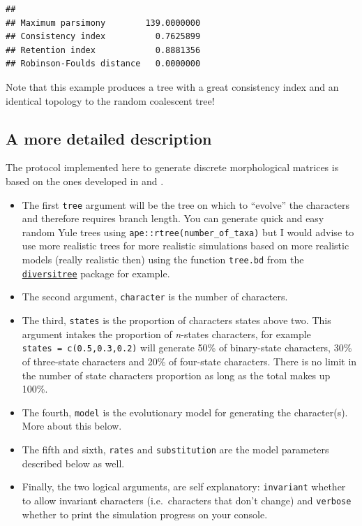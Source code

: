 \documentclass[]{book}
\providecommand{\tightlist}{%
  \setlength{\itemsep}{0pt}\setlength{\parskip}{0pt}}
\theoremstyle{definition}
\theoremstyle{definition}
\theoremstyle{definition}
\theoremstyle{remark}
\begin{document}
\begin{verbatim}
##                                     
## Maximum parsimony        139.0000000
## Consistency index          0.7625899
## Retention index            0.8881356
## Robinson-Foulds distance   0.0000000
\end{verbatim}

Note that this example produces a tree with a great consistency index
and an identical topology to the random coalescent tree!

\subsection{A more detailed
description}\label{a-more-detailed-description}

The protocol implemented here to generate discrete morphological
matrices is based on the ones developed in \citet{GuillermeCooper}
\citet{OReilly2016} \citet{puttick2017uncertain} and
\citet{OReilly2017}.

\begin{itemize}
\tightlist
\item
  The first \texttt{tree} argument will be the tree on which to
  ``evolve'' the characters and therefore requires branch length. You
  can generate quick and easy random Yule trees using
  \texttt{ape::rtree(number\_of\_taxa)} but I would advise to use more
  realistic trees for more realistic simulations based on more realistic
  models (really realistic then) using the function \texttt{tree.bd}
  from the
  \href{http://www.zoology.ubc.ca/prog/diversitree/}{\texttt{diversitree}}
  package \citep{fitzjohndiversitree2012} for example.
\item
  The second argument, \texttt{character} is the number of characters.
\item
  The third, \texttt{states} is the proportion of characters states
  above two. This argument intakes the proportion of \emph{n}-states
  characters, for example \texttt{states\ =\ c(0.5,0.3,0.2)} will
  generate 50\% of binary-state characters, 30\% of three-state
  characters and 20\% of four-state characters. There is no limit in the
  number of state characters proportion as long as the total makes up
  100\%.
\item
  The fourth, \texttt{model} is the evolutionary model for generating
  the character(s). More about this below.
\item
  The fifth and sixth, \texttt{rates} and \texttt{substitution} are the
  model parameters described below as well.
\item
  Finally, the two logical arguments, are self explanatory:
  \texttt{invariant} whether to allow invariant characters
  (i.e.~characters that don't change) and \texttt{verbose} whether to
  print the simulation progress on your console.
\end{itemize}
\end{document}
